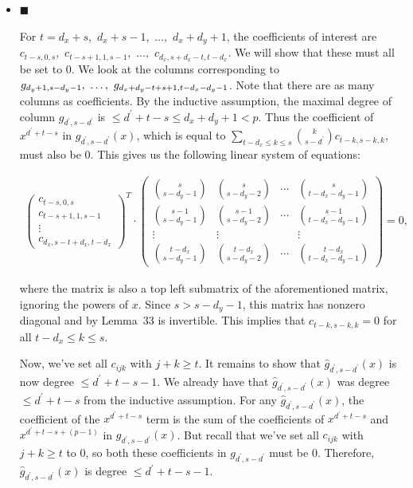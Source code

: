 \documentclass[10pt,a4paper]{article}
\begin{document}
\begin{itemize}


\item[] 
$\blacksquare$ 


For $t=d_{x}+s,$ $d_{x}+s-1,$ $\dots,$ $d_{x}+d_{y}+1$, the coefficients of interest are $c_{t-s,0,s},$ $c_{t-s+1,1,s-1},$ $\dots,$ $c_{d_{x},s+d_{x}-t,t-d_{x}}$. We will show that these must all be set to $0$. We look at the columns corresponding to $g_{d_{y}+1,s-d_{y}-1},\nobreak\ \dots,\nobreak\ g_{d_{x}+d_{y}-t+s+1,t-d_{x}-d_{y}-1}$. Note that there are as many columns as coefficients. By the inductive assumption, the maximal degree of column $g_{d^{\prime},s-d^{\prime}}$ is $\leq d^{\prime}+t-s\leq d_{x}+d_{y}+1<p$. Thus the coefficient of $x^{d^{\prime}+t-s}$ in $g_{d^{\prime},s-d^{\prime}}(x)$, which is equal to $\sum_{t-d_{x}\leq k\leq s}\binom{k}{s-d^{\prime}}c_{t-k,s-k,k}$, must also be $0$. This gives us the following linear system of equations:\par


\[\begin{gathered}
\begin{pmatrix}c_{t-s,0,s}\\
c_{t-s+1,1,s-1}\\
\vdots\\
c_{d_{x},s-t+d_{x},t-d_{x}}\end{pmatrix}^{T}\cdot\begin{pmatrix}\binom{s}{s-d_{y}-1}&\binom{s}{s-d_{y}-2}&\cdots&\binom{s}{t-d_{x}-d_{y}-1}\\
\binom{s-1}{s-d_{y}-1}&\binom{s-1}{s-d_{y}-2}&\cdots&\binom{s-1}{t-d_{x}-d_{y}-1}\\
\vdots&\vdots&&\vdots\\
\binom{t-d_{x}}{s-d_{y}-1}&\binom{t-d_{x}}{s-d_{y}-2}&\cdots&\binom{t-d_{x}}{t-d_{x}-d_{y}-1}\end{pmatrix}=0,
\end{gathered}\]


where the matrix is also a top left submatrix of the aforementioned matrix, ignoring the powers of $x$. Since $s>s-d_{y}-1$, this matrix has nonzero diagonal and by Lemma 33 is invertible. This implies that $c_{t-k,s-k,k}=0$ for all $t-d_{x}\leq k\leq s$.\par




Now, we’ve set all $c_{ijk}$ with $j+k\geq t$. It remains to show that $\hat{g}_{d^{\prime},s-d^{\prime}}(x)$ is now degree $\leq d^{\prime}+t-s-1$. We already have that $\hat{g}_{d^{\prime},s-d^{\prime}}(x)$ was degree $\leq d^{\prime}+t-s$ from the inductive assumption. For any $\hat{g}_{d^{\prime},s-d^{\prime}}(x)$, the coefficient of the $x^{d^{\prime}+t-s}$ term is the sum of the coefficients of $x^{d^{\prime}+t-s}$ and $x^{d^{\prime}+t-s+(p-1)}$ in $g_{d^{\prime},s-d^{\prime}}(x)$. But recall that we’ve set all $c_{ijk}$ with $j+k\geq t$ to $0$, so both these coefficients in $g_{d^{\prime},s-d^{\prime}}$ must be $0$. Therefore, $\hat{g}_{d^{\prime},s-d^{\prime}}(x)$ is degree $\leq d^{\prime}+t-s-1$.\par






\end{itemize}
\end{document}
